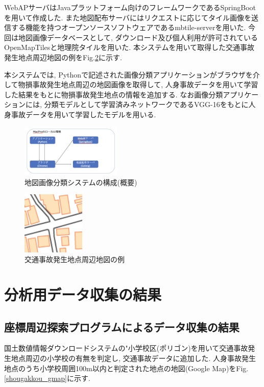 \documentclass[a4j,8.5pt, twocolumn,fleqn]{jbook}
\begin{document}
WebAPサーバはJavaプラットフォーム向けのフレームワークであるSpringBootを用いて作成した. また地図配布サーバにはリクエストに応じてタイル画像を送信する機能を持つオープンソースソフトウェアであるmbtile-server\cite{mbtile-server}を用いた. 
今回は地図画像データベースとして, ダウンロード及び個人利用が許可されているOpenMapTiles\cite{openmaptiles}と地理院タイル\cite{tiriixn_tile}を用いた. 
本システムを用いて取得した交通事故発生地点周辺地図の例をFig.\ref{tiriixn}に示す. 

本システムでは, Pythonで記述された画像分類アプリケーションがブラウザを介して物損事故発生地点周辺の地図画像を取得して, 人身事故データを用いて学習した結果をもとに物損事故発生地点の情報を追加する. 
なお画像分類アプリケーションには, 分類モデルとして学習済みネットワークであるVGG-16をもとに人身事故データを用いて学習したモデルを用いる. 

\begin{figure}[htb]
    \centering
    \includegraphics[height=25mm]{images/mapclassification_server.png}
    \vspace{-3mm}
    \caption{地図画像分類システムの構成(概要)}
    \label{classifications}
\end{figure}

\begin{figure}[htb]
    \centering
    \includegraphics[height=30mm]{images/tiriixn.png}
    \vspace{-3mm}
    \caption{交通事故発生地点周辺地図の例}
    \label{tiriixn}
\end{figure}


\section{分析用データ収集の結果}
\subsection{座標周辺探索プログラムによるデータ収集の結果}
国土数値情報ダウンロードシステムの"小学校区(ポリゴン)を用いて交通事故発生地点周辺の小学校の有無を判定し, 交通事故データに追加した. 
人身事故発生地点のうち小学校周囲100m以内と判定された地点の地図(Google Map)をFig.\ref{shougakkou_gmap}に示す. 
\end{document}
